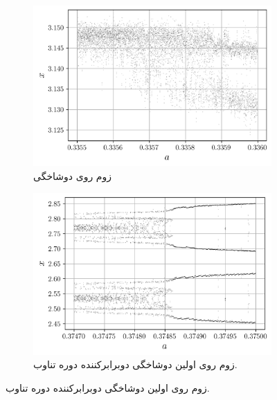 \documentclass[12pt,a4paper]{article}
\begin{document}
	\begin{figure}[h!]
		\begin{subfigure}{0.49\linewidth}
			\centering
			\includegraphics[width=\linewidth]{fig/12.3.1.zoom.hopf}
			\caption{زوم روی دوشاخگی }
		\end{subfigure}
		\begin{subfigure}{0.49\linewidth}
			\centering
			\includegraphics[width=\linewidth]{fig/12.3.1.zoom.double}
			\caption{زوم روی اولین دوشاخگی دوبرابرکننده دوره تناوب.}
		\end{subfigure}
	\end{figure}

	\FloatBarrier
\end{document}
